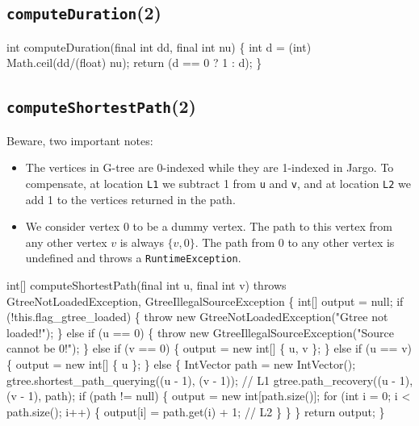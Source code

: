 \subsection{\texttt{computeDuration}(2)}
\nwenddocs{}\endmoddef{}
int computeDuration(final int dd, final int nu) \{
  int d = (int) Math.ceil(dd/(float) nu);
  return (d == 0 ? 1 : d);
\}
\nwendcode{}\nwdocspar

\subsection{\texttt{computeShortestPath}(2)}
Beware, two important notes:
\begin{itemize}
\item The vertices in G-tree are 0-indexed while they are 1-indexed in Jargo.  To
compensate, at location {\tt{}L1} we subtract 1 from {\tt{}u} and {\tt{}v}, and at
location {\tt{}L2} we add 1 to the vertices returned in the path.
\item We consider vertex 0 to be a dummy vertex. The path to this vertex
from any other vertex $v$ is always $\{v, 0\}$. The path from 0 to any other
vertex is undefined and throws a {\tt{}RuntimeException}.
\end{itemize}
\nwenddocs{}\endmoddef{}
int[] computeShortestPath(final int u, final int v)
throws GtreeNotLoadedException, GtreeIllegalSourceException \{
  int[] output = null;
  if (!this.flag_gtree_loaded) \{
    throw new GtreeNotLoadedException("Gtree not loaded!");
  \} else if (u == 0) \{
    throw new GtreeIllegalSourceException("Source cannot be 0!");
  \} else if (v == 0) \{
    output = new int[] \{ u, v \};
  \} else if (u == v) \{
    output = new int[] \{ u \};
  \} else \{
    IntVector path = new IntVector();
    gtree.shortest_path_querying((u - 1), (v - 1)); // L1
    gtree.path_recovery((u - 1), (v - 1), path);
    if (path != null) \{
      output = new int[path.size()];
      for (int i = 0; i < path.size(); i++) \{
        output[i] = path.get(i) + 1;                // L2
      \}
    \}
  \}
  return output;
\}
\eatline
{}\nwendcode{}\nwdocspar
